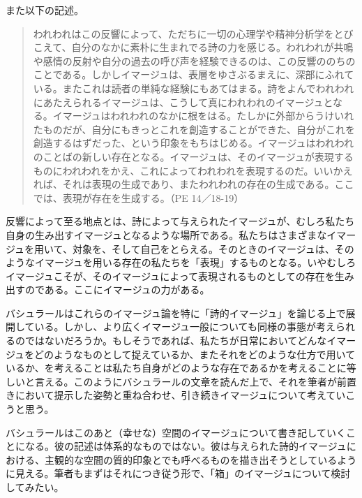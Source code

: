 \documentclass[b5j,twoside,twocolumn]{utarticle}
\begin{document}
また以下の記述。
\begin{quote}
われわれはこの反響によって、ただちに一切の心理学や精神分析学をとびこえて、自分のなかに素朴に生まれでる詩の力を感じる。われわれが共鳴や感情の反射や自分の過去の呼び声を経験できるのは、この反響ののちのことである。しかしイマージュは、表層をゆさぶるまえに、深部にふれている。またこれは読者の単純な経験にもあてはまる。詩をよんでわれわれにあたえられるイマージュは、こうして真にわれわれのイマージュとなる。イマージュはわれわれのなかに根をはる。たしかに外部からうけいれたものだが、自分にもきっとこれを創造することができた、自分がこれを創造するはずだった、という印象をもちはじめる。イマージュはわれわれのことばの新しい存在となる。イマージュは、そのイマージュが表現するものにわれわれをかえ、これによってわれわれを表現するのだ。いいかえれば、それは表現の生成であり、またわれわれの存在の生成である。ここでは、表現が存在を生成する。（PE 14／18-19）
\end{quote}

反響によって至る地点とは、詩によって与えられたイマージュが、むしろ私たち自身の生み出すイマージュとなるような場所である。私たちはさまざまなイマージュを用いて、対象を、そして自己をとらえる。そのときのイマージュは、そのようなイマージュを用いる存在の私たちを「表現」するものとなる。いやむしろイマージュこそが、そのイマージュによって表現されるものとしての存在を生み出すのである。ここにイマージュの力がある。


バシュラールはこれらのイマージュ論を特に「詩的イマージュ」を論じる上で展開している。しかし、より広くイマージュ一般についても同様の事態が考えられるのではないだろうか。もしそうであれば、私たちが日常においてどんなイマージュをどのようなものとして捉えているか、またそれをどのような仕方で用いているか、を考えることは私たち自身がどのような存在であるかを考えることに等しいと言える。このようにバシュラールの文章を読んだ上で、それを筆者が前置きにおいて提示した姿勢と重ね合わせ、引き続きイマージュについて考えていこうと思う。


バシュラールはこのあと（幸せな）空間のイマージュについて書き記していくことになる。彼の記述は体系的なものではない。彼は与えられた詩的イマージュにおける、主観的な空間の質的印象とでも呼べるものを描き出そうとしているように見える。筆者もまずはそれにつき従う形で、「箱」のイマージュについて検討してみたい。
\end{document}
